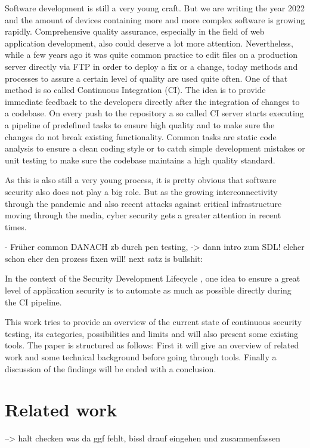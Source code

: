 \documentclass[conference]{IEEEtran}
\begin{document}
Software development is still a very young craft. But we are writing the year 2022 and the amount of devices containing more and more complex software is growing rapidly. Comprehensive quality assurance, especially in the field of web application development, also could deserve a lot more attention. Nevertheless, while a few years ago it was quite common practice to edit files on a production server directly via FTP in order to deploy a fix or a change, today methods and processes to assure a certain level of quality are used quite often. One of that method is so called Continuous Integration (CI). The idea is to provide immediate feedback to the developers directly after the integration of changes to a codebase. On every push to the repository a so called CI server starts executing a pipeline of predefined tasks to ensure high quality and to make sure the changes do not break existing functionality. Common tasks are static code analysis to ensure a clean coding style or to catch simple development mistakes or unit testing to make sure the codebase maintains a high quality standard.

As this is also still a very young process, it is pretty obvious that software security also does not play a big role. But as the growing interconnectivity through the pandemic and also recent attacks against critical infrastructure moving through the media, cyber security gets a greater attention in recent times.

- Früher common DANACH zb durch pen testing, -> dann intro zum SDL! elcher schon eher den prozess fixen will!
next satz is bullshit:

 In the context of the Security Development Lifecycle \cite{sdl}, one idea to ensure a great level of application security is to automate as much as possible directly during the CI pipeline. 

This work tries to provide an overview of the current state of continuous security testing, its categories, possibilities and limits and will also present some existing tools. The paper is structured as follows: First it will give an overview of related work and some technical background before going through tools. Finally a discussion of the findings will be ended with a conclusion.

\section{Related work}

\cite{relatedpaper1}
\cite{relatedpaper2}
\cite{relatedpaper3}
\cite{relatedpaper4}
\cite{relatedpaper5}
\cite{relatedpaper6}
--> halt checken was da ggf fehlt, bissl drauf eingehen und zusammenfassen
\end{document}
